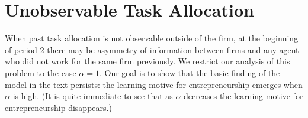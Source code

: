 \documentclass[12pt,american]{paper}
\theoremstyle{remark}
\begin{document}
% 
% 
% 
% 
% 






\section{Unobservable Task Allocation}\label{app:unobservable}

When past task allocation is not observable outside of the firm, at the beginning of period 2 there may be asymmetry of information between firms and any agent who did not work for the same firm previously. %
We restrict our analysis of this problem to the case $\alpha=1$. Our goal is to show that the basic finding of the model in the text persists:  the learning motive for entrepreneurship emerges when $\alpha$ is high. (It is quite immediate to see that as $\alpha$ decreases the learning motive for entrepreneurship disappears.)
\end{document}
